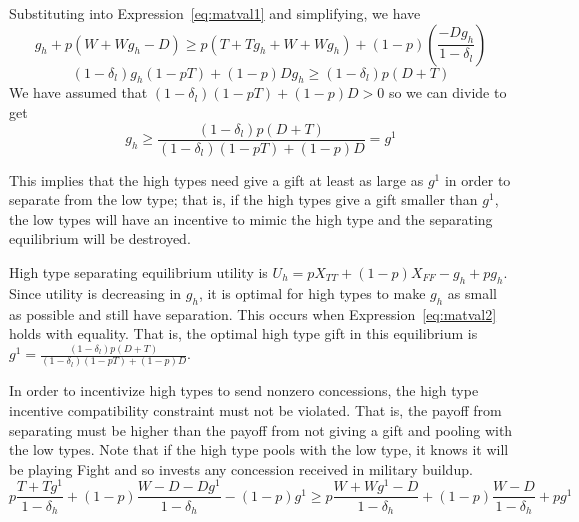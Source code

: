 \documentclass[12pt, letterpaper]{article}
\newcommand{\de}{\delta}
\begin{document}
{Substituting into Expression~\ref{eq:matval1} and simplifying, we have
\begin{equation*}
	g_h + p(W+Wg_h-D) \geq p\left(T + Tg_h +W + Wg_h \right) + (1-p)\left( \frac{-Dg_h}{1-\de_l}  \right)
\end{equation*}
\begin{equation*}
	\left(1-\de_l\right)g_h\left(1 - pT \right) + (1-p) Dg_h\geq \left(1-\de_l\right)p\left(D +	 T\right)
\end{equation*}
We have assumed that $\left(1-\de_l\right)\left(1 - pT \right) + (1-p) D > 0$ so we can divide to get
\begin{equation}
	g_h \geq \frac{\left(1-\de_l\right)p\left(D +	 T\right)}{\left(1-\de_l\right)\left(1 - pT \right) + (1-p) D} = g^1
	\label{eq:matval2}
\end{equation}

This implies that the high types need give a gift at least as large as $g^1$ in order to separate from the low type; that is, if the high types give a gift smaller than $g^1$, the low types will have an incentive to mimic the high type and the separating equilibrium will be destroyed.

High type separating equilibrium utility is $U_h= pX_{TT}+(1-p)X_{FF} - g_h+pg_h$. Since utility is decreasing in $g_h$, it is optimal for high types to make $g_h$ as small as possible and still have separation. This occurs when Expression~\ref{eq:matval2} holds with equality. That is, the optimal high type gift in this equilibrium is $g^1 = \frac{\left(1-\de_l\right)p\left(D +	 T\right)}{\left(1-\de_l\right)\left(1 - pT \right) + (1-p) D}$.

In order to incentivize high types to send nonzero concessions, the high type incentive compatibility constraint must not be violated. That is, the payoff from separating must be higher than the payoff from not giving a gift and pooling with the low types. Note that if the high type pools with the low type, it knows it will be playing Fight and so invests any concession received in military buildup. 
\begin{equation*}
	p\frac{T+Tg^1}{1-\de_h} + (1-p)\frac{W-D-Dg^1}{1-\de_h} - (1-p)g^1 \geq 
	p\frac{W+Wg^1-D}{1-\de_h} + (1-p)\frac{W-D}{1-\de_h} +pg^1
\label{eq:matval3}
\end{equation*}

}
\end{document}
